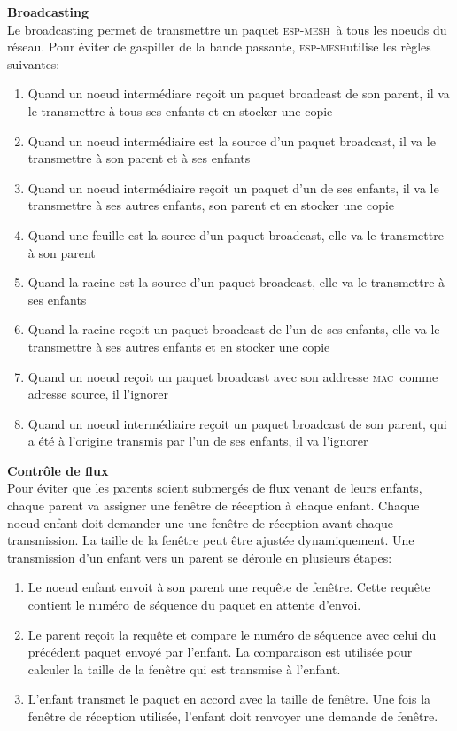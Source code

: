 \documentclass[a4paper, 12pt]{report}
\newcommand{\espmesh}{\textsc{esp-mesh}}
\newcommand{\mac}{\textsc{mac}}
\begin{document}
        \vspace{0.5cm}
        \textbf{Broadcasting}\\
            Le broadcasting permet de transmettre un paquet \espmesh\ à tous les noeuds du réseau. Pour éviter de gaspiller de
            la bande passante, \espmesh utilise les règles suivantes:
            \begin{enumerate}
                \item Quand un noeud intermédiare reçoit un paquet broadcast de son parent, il va le transmettre à tous ses enfants
                    et en stocker une copie
                \item Quand un noeud intermédiaire est la source d'un paquet broadcast, il va le transmettre à son parent et à ses enfants
                \item Quand un noeud intermédiaire reçoit un paquet d'un de ses enfants, il va le transmettre à ses autres enfants, son parent
                    et en stocker une copie
                \item Quand une feuille est la source d'un paquet broadcast, elle va le transmettre à son parent
                \item Quand la racine est la source d'un paquet broadcast, elle va le transmettre à ses enfants
                \item Quand la racine reçoit un paquet broadcast de l'un de ses enfants, elle va le transmettre à ses autres enfants et en stocker une copie
                \item Quand un noeud reçoit un paquet broadcast avec son addresse \mac\ comme adresse source, il l'ignorer
                \item Quand un noeud intermédiaire reçoit un paquet broadcast de son parent, qui a été à l'origine transmis par l'un de ses enfants, il va l'ignorer
            \end{enumerate}
        \vspace{0.5cm}
        \textbf{Contrôle de flux}\\
            Pour éviter que les parents soient submergés de flux venant de leurs enfants, chaque parent va
            assigner une fenêtre de réception à chaque enfant. Chaque noeud enfant doit demander une une fenêtre
            de réception avant chaque transmission. La taille de la fenêtre peut être ajustée dynamiquement.
            Une transmission d'un enfant vers un parent se déroule en plusieurs étapes:
            \begin{enumerate}
                \item Le noeud enfant envoit à son parent une requête de fenêtre. Cette requête contient le numéro de séquence du paquet en attente d'envoi.
                \item Le parent reçoit la requête et compare le numéro de séquence avec celui du précédent paquet envoyé par l'enfant.
                    La comparaison est utilisée pour calculer la taille de la fenêtre qui est transmise à l'enfant.
                \item L'enfant transmet le paquet en accord avec la taille de fenêtre. Une fois la fenêtre de réception utilisée, l'enfant doit renvoyer une demande de fenêtre.
            \end{enumerate}
\end{document}
